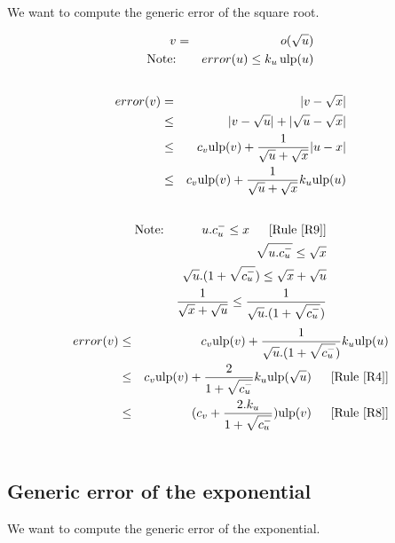 \documentclass[12pt]{amsart}
\def\ulp{{\rm ulp}}
\newcommand{\U}[1]{\quad \mbox{[Rule~\ref{#1}]}}
\begin{document}
We want to compute the generic error of the square root.

\begin{eqnarray}\nonumber
v&=&o(\sqrt{u}) \\\nonumber
\textnormal{Note:}&& error(u) \leq k_u \, \ulp(u)\\\nonumber
\end{eqnarray}
\begin{eqnarray}\nonumber
error(v)& = &|v - \sqrt{x}| \\\nonumber
& \leq &|v - \sqrt{u}| +|\sqrt{u} - \sqrt{x}| \\\nonumber
& \leq & c_v \ulp(v) + \frac{1}{\sqrt{u} + \sqrt{x}}|u-x| \\\nonumber
& \leq & c_v \ulp(v) + \frac{1}{\sqrt{u} + \sqrt{x}} k_u \ulp(u) \\\nonumber
\end{eqnarray}
\begin{eqnarray}\nonumber
\textnormal{Note:}&& u.c_u^- \leq x \;\; \U{R9}\\\nonumber
 && \sqrt{u.c_u^-} \leq \sqrt{x} \\\nonumber 
 && \sqrt{u}.(1+\sqrt{c_u^-}) \leq \sqrt{x}+\sqrt{u} \\\nonumber 
 && \frac{1}{\sqrt{x}+\sqrt{u}} \leq
    \frac{1}{\sqrt{u}.(1+\sqrt{c_u^-})} 
\end{eqnarray}
\begin{eqnarray}\nonumber
error(v)& \leq & c_v \ulp(v) + 
                 \frac{1}{\sqrt{u}.(1+\sqrt{c_u^-})}  k_u \ulp(u) \\\nonumber 
& \leq & c_v \ulp(v) + \frac{2}{1+\sqrt{c_u^-}}  
       k_u \ulp(\sqrt{u}) \;\; \U{R4}\\\nonumber 
& \leq & (c_v + \frac{2.k_u}{1+\sqrt{c_u^-}})  \ulp(v) \;\; \U{R8}\\\nonumber 
\end{eqnarray}

\subsection{Generic error of the exponential }\label{generic:exp}


We want to compute the generic error of the exponential.
\end{document}
